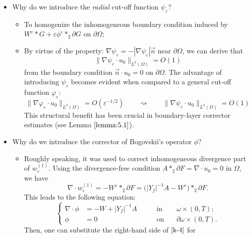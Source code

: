 \documentclass[13pt,CJK]{article}
\theoremstyle{plain}                       %
\theoremstyle{remark}
\numberwithin{equation}{section}
\begin{document}
\begin{itemize}
  \item Why do we introduce the \emph{radial} cut-off function $\psi_\varepsilon$?
   \begin{itemize}
     \item To homogenize the inhomogeneous boundary condition induced  by $W^{\varepsilon}\ast G+\varepsilon
\phi^\varepsilon\ast_{2} \partial G$ on $\partial\Omega$;
     \item By virtue of the property: $\nabla \psi_{\varepsilon}=-|\nabla \psi_{\varepsilon}|\vec{n}$ near $\partial\Omega$, we can derive that
\begin{equation*}
\|\nabla\psi_\varepsilon \cdot u_0\|_{L^2(\Omega)} = O(1)
\end{equation*}
from the boundary condition $\vec{n}\cdot u_0 = 0$ on $\partial\Omega$. The advantage of introducing $\psi_\varepsilon$
becomes evident when compared to a general cut-off function $\varphi_\varepsilon$:
\begin{equation*}
  \|\nabla\varphi_\varepsilon \cdot u_0\|_{L^2(\Omega)}
  =O(\varepsilon^{-1/2})\qquad \rightsquigarrow\qquad
  \|\nabla\psi_\varepsilon \cdot u_0\|_{L^2(\Omega)}=O(1)
\end{equation*}
This structural benefit has been crucial in boundary-layer corrector estimates  (see Lemma $\ref{lemma:5.1}$).
   \end{itemize}
  \item Why do we introduce the corrector of Bogovskii's operator $\phi$?
  \begin{itemize}
    \item Roughly speaking, it was used to correct inhomogeneous divergence part of $w_\varepsilon^{(1)}$. Using the divergence-free condition $A*_2\partial F = \nabla\cdot u_0 = 0$ in $\Omega$, we have
\begin{equation}\label{k-4}
 \nabla\cdot w_\varepsilon^{(1)}
 = -W^\varepsilon*_2\partial F
 = \big(|Y_f|^{-1}A -W^\varepsilon\big)*_2\partial F.
\end{equation}
This leads to the following equation:
\begin{equation}\label{divc1*}
\left\{
\begin{aligned}
\nabla\cdot\phi &=-W
+|Y_f|^{-1} A &\qquad\text{in}&\quad\omega\times(0,T);\\
\phi&=0&\qquad\text{on}&\quad\partial\omega\times(0,T).
\end{aligned}
\right.
\end{equation}
Then, one can substitute the right-hand side of $\eqref{k-4}$ for

\end{itemize}
\end{itemize}
\end{document}

